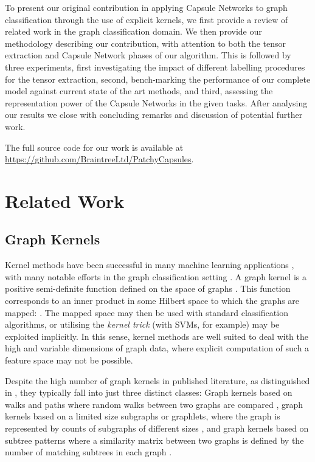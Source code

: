 \documentclass[conference]{IEEEtran}
\begin{document}
To present our original contribution in applying Capsule Networks to graph classification through the use of explicit kernels, we first provide a review of related work in the graph classification domain. We then provide our methodology describing our contribution, with attention to both the tensor extraction and Capsule Network phases of our algorithm. This is followed by three experiments, first investigating the impact of different labelling procedures for the tensor extraction, second, bench-marking the performance of our complete model against current state of the art methods, and third, assessing the representation power of the Capsule Networks in the given tasks. After analysing our results we close with concluding remarks and discussion of potential further work.

The full source code for our work is available at  \href{https://github.com/BraintreeLtd/PatchyCapsules}{https://github.com/BraintreeLtd/PatchyCapsules}.

\section{Related Work}

\subsection{Graph Kernels}
Kernel methods have been successful in many machine learning applications \cite{hofmann2008kernel}, with many notable efforts in the graph classification setting \cite{gartner2003kernels,neuhaus2009kernel,vishwanathan2010graph}. A graph kernel is a positive semi-definite function defined on the space of graphs . This function corresponds to an inner product in some Hilbert space  to which the graphs are mapped: . The mapped space  may then be used with standard classification algorithms, or utilising the \emph{kernel trick} (with SVMs, for example) may be exploited implicitly. In this sense, kernel methods are well suited to deal with the high and variable dimensions of graph data, where explicit computation of such a feature space may not be possible.

Despite the high number of graph kernels in published literature, as distinguished in \cite{shervashidze2011weisfeiler}, they typically fall into just three distinct classes: Graph kernels based on walks and paths where random walks between two graphs are compared  \cite{borgwardt2005protein}, graph kernels based on a limited size subgraphs or graphlets, where the graph is represented by counts of subgraphs of different sizes \cite{shervashidze2009fast}, and graph kernels based on subtree patterns where a similarity matrix between two graphs is defined by the number of matching subtrees in each graph \cite{harchaoui2007image}.
\end{document}
